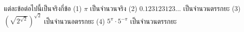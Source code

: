 ﻿%
\question แต่ละข้อต่อไปนี้เป็นจริงกี่ข้อ \newline
(1) $\pi$ เป็นจำนวนจริง \newline
(2) $0.123123123...$ เป็นจำนวนตรรกยะ \newline
(3) $(\sqrt{2^{\sqrt{2}}})^{\sqrt{2}}$ เป็นจำนวนอตรรกยะ \newline
(4) $5^{\pi} \cdot 5^{-\pi}$ เป็นจำนวนตรรกยะ \newline
{}
